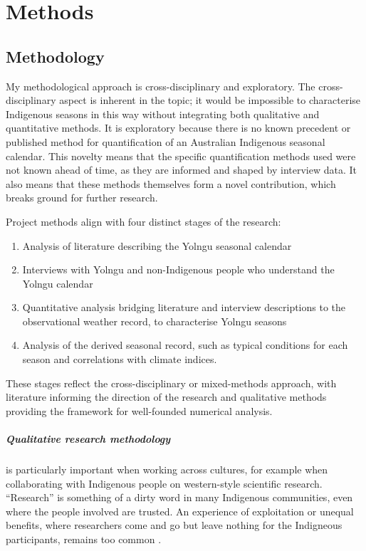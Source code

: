 \chapter{Methods}
\label{ch:methods}

\section{Methodology}

My methodological approach is cross-disciplinary and exploratory.
%
The cross-disciplinary aspect is inherent in the topic; it would
be impossible to characterise Indigenous seasons in this way without
integrating both qualitative and quantitative methods.
%
It is exploratory because there is no known precedent or published
method for quantification of an Australian Indigenous seasonal calendar.
This novelty means that the specific quantification methods used
were not known ahead of time, as they are informed and shaped by
interview data.  It also means that these methods themselves form
a novel contribution, which breaks ground for further research.

Project methods align with four distinct stages of the research:
\begin{enumerate}
\item Analysis of literature describing the Yolngu seasonal calendar
\item Interviews with Yolngu and non-Indigenous people who
    understand the Yolngu calendar
\item Quantitative analysis bridging literature and interview
    descriptions to the observational weather record, to characterise
    Yolngu seasons
\item Analysis of the derived seasonal record, such as typical
    conditions for each season and correlations with climate indices.
\end{enumerate}
These stages reflect the cross-disciplinary or mixed-methods approach,
with literature informing the direction of the research and qualitative
methods providing the framework for well-founded numerical analysis.


\paragraph{Qualitative research methodology} is particularly important
when working across cultures, for example when collaborating with
Indigenous people on western-style scientific research.
%
``Research'' is something of a dirty word in many Indigenous communities,
even where the people involved are trusted.  An experience of exploitation
or unequal benefits, where researchers come and go but leave nothing
for the Indigneous participants, remains too common \citep[eg.][]{smith1999}.

